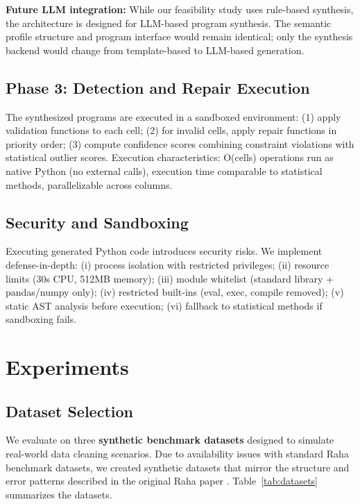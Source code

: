 \documentclass{article}
\begin{document}
\textbf{Future LLM integration:} While our feasibility study uses rule-based synthesis, the architecture is designed for LLM-based program synthesis. The semantic profile structure and program interface would remain identical; only the synthesis backend would change from template-based to LLM-based generation.

\subsection{Phase 3: Detection and Repair Execution}
\label{sec:execution}

The synthesized programs are executed in a sandboxed environment: (1) apply validation functions to each cell; (2) for invalid cells, apply repair functions in priority order; (3) compute confidence scores combining constraint violations with statistical outlier scores. Execution characteristics: O(cells) operations run as native Python (no external calls), execution time comparable to statistical methods, parallelizable across columns.

\subsection{Security and Sandboxing}
\label{sec:security}

Executing generated Python code introduces security risks. We implement defense-in-depth: (i) process isolation with restricted privileges; (ii) resource limits (30s CPU, 512MB memory); (iii) module whitelist (standard library + pandas/numpy only); (iv) restricted built-ins (eval, exec, compile removed); (v) static AST analysis before execution; (vi) fallback to statistical methods if sandboxing fails.

\section{Experiments}
\label{sec:experiments}

\subsection{Dataset Selection}
\label{sec:datasets}

We evaluate on three \textbf{synthetic benchmark datasets} designed to simulate real-world data cleaning scenarios. Due to availability issues with standard Raha benchmark datasets, we created synthetic datasets that mirror the structure and error patterns described in the original Raha paper \citep{mahdavi2019raha}. Table~\ref{tab:datasets} summarizes the datasets.
\end{document}
